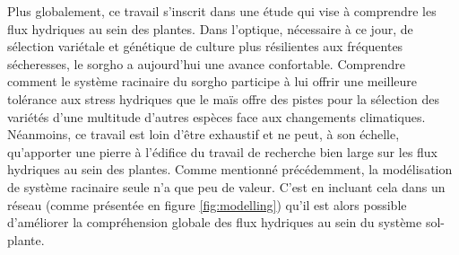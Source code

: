 Plus globalement, ce travail s'inscrit dans une étude qui vise à comprendre les flux hydriques au sein des plantes.
Dans l'optique, nécessaire à ce jour, de sélection variétale et génétique de culture plus résilientes aux fréquentes sécheresses, le sorgho a aujourd'hui une avance confortable.
Comprendre comment le système racinaire du sorgho participe à lui offrir une meilleure tolérance aux stress hydriques que le maïs offre des pistes pour la sélection des variétés d'une multitude d'autres espèces face aux changements climatiques.
Néanmoins, ce travail est loin d'être exhaustif et ne peut, à son échelle, qu'apporter une pierre à l'édifice du travail de recherche bien large sur les flux hydriques au sein des plantes. 
Comme mentionné précédemment, la modélisation de système racinaire seule n'a que peu de valeur.
C'est en incluant cela dans un réseau (comme présentée en figure \ref{fig:modelling}) qu'il est alors possible d'améliorer la compréhension globale des flux hydriques au sein du système sol-plante.